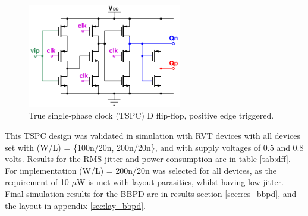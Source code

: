 			\begin{figure}[htb!]
			        \centering
			        \includegraphics[width=0.6\textwidth, angle=0]{./figs/design/tspc_}
			    \caption{True single-phase clock (TSPC) D flip-flop, positive edge triggered.}
			    \label{fig:tspc_dff}
			\end{figure}

		This TSPC design was validated in simulation with RVT devices with all devices set with (W/L) = \{100n/20n, 200n/20n\}, and with supply voltages of 0.5 and 0.8 volts. Results for the RMS jitter and power consumption are in table \ref{tab:dff}. For implementation (W/L) = 200n/20n was selected for all devices, as the requirement of 10 $\mu$W is met with layout parasitics, whilst having low jitter. Final simulation results for the BBPD are in results section \ref{sec:res_bbpd}, and the layout in appendix \ref{sec:lay_bbpd}.




